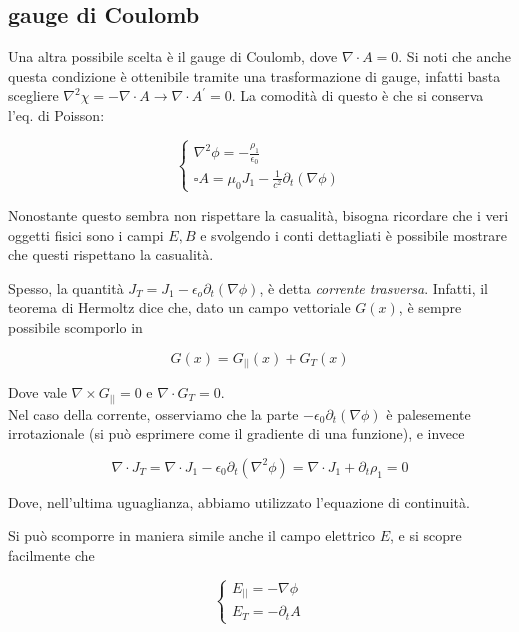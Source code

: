 \documentclass{report}
\begin{document}
\subsection{gauge di Coulomb}

Una altra possibile scelta è il gauge di Coulomb, dove $\nabla \cdot A = 0$. Si noti che anche questa condizione è ottenibile tramite una trasformazione di gauge, infatti basta scegliere $\nabla^2\chi = - \nabla \cdot A \rightarrow \nabla \cdot A^{'} =0$. La comodità di questo è che si conserva l'eq. di Poisson: 

\[\begin{cases}
    \nabla^2\phi = -\frac{\rho_1}{\epsilon_0} \\
    \square A = \mu_0J_1 - \frac{1}{c^2}\partial_t(\nabla\phi)
\end{cases}\]

Nonostante questo sembra non rispettare la casualità, bisogna ricordare che i veri oggetti fisici sono i campi $E, B$ e svolgendo i conti dettagliati è possibile mostrare che questi rispettano la casualità. 

Spesso, la quantità $J_T = J_1 - \epsilon_o\partial_t(\nabla\phi)$, è detta \emph{corrente trasversa}. Infatti, il teorema di Hermoltz dice che, dato un campo vettoriale $G(x)$, è sempre possibile scomporlo in 

\begin{equation}
    G(x) = G_{||}(x) + G_{T}(x)
\end{equation}

Dove vale $\nabla \times G_{||} = 0$ e $\nabla \cdot G_T = 0$. \\
Nel caso della corrente, osserviamo che la parte $-\epsilon_0\partial_t(\nabla\phi)$ è palesemente irrotazionale (si può esprimere come il gradiente di una funzione), e invece 

\begin{equation}
    \nabla \cdot J_T =  \nabla \cdot J_1 - \epsilon_0\partial_t(\nabla^2\phi) = \nabla \cdot J_1 + \partial_t\rho_1 = 0
\end{equation}

Dove, nell'ultima uguaglianza, abbiamo utilizzato l'equazione di continuità. 

Si può scomporre in maniera simile anche il campo elettrico $E$, e si scopre facilmente che 

\[\begin{cases}
    E_{||} = -\nabla\phi \\
    E_T = -\partial_tA
\end{cases}\]
\end{document}
